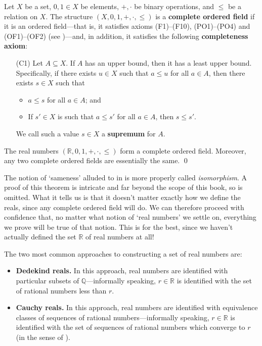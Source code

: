 \begin{axioms}
\label{axCompleteOrderedField}
Let $X$ be a set, $0,1 \in X$ be elements, $+,{\cdot}$ be binary operations, and $\le$ be a relation on $X$. The structure $(X,0,1,+,{\cdot},{\le})$ is a \textbf{complete ordered field} if it is an ordered field---that is, it satisfies axioms (F1)--(F10), (PO1)--(PO4) and (OF1)--(OF2) (see )---and, in addition, it satisfies the following \textbf{completeness axiom}:
\begin{itemize}[leftmargin=30pt]
\item[(C1)] Let $A \subseteq X$. If $A$ has an upper bound, then it has a least upper bound. Specifically, if there exists $u \in X$ such that $a \le u$ for all $a \in A$, then there exists $s \in X$ such that
\begin{itemize}
\item $a \le s$ for all $a \in A$; and
\item If $s' \in X$ is such that $a \le s'$ for all $a \in A$, then $s \le s'$.
\end{itemize}
We call such a value $s \in X$ a \textbf{supremum} for $A$.
\end{itemize}
\end{axioms}

\begin{theorem}
\label{thmRIsTheUniqueCompleteOrderedField}
The real numbers $(\mathbb{R},0,1,+,\cdot,\le)$ form a complete ordered field. Moreover, any two complete ordered fields are essentially the same. \qed
\end{theorem}

The notion of `sameness' alluded to in  is more properly called \textit{isomorphism}. A proof of this theorem is intricate and far beyond the scope of this book, so is omitted. What it tells us is that it doesn't matter exactly how we define the reals, since any complete ordered field will do. We can therefore proceed with confidence that, no matter what notion of `real numbers' we settle on, everything we prove will be true of that notion. This is for the best, since we haven't actually defined the set $\mathbb{R}$ of real numbers at all!

The two most common approaches to constructing a set of real numbers are:
\begin{itemize}
\item \textbf{Dedekind reals.} In this approach, real numbers are identified with particular subsets of $\mathbb{Q}$---informally speaking, $r \in \mathbb{R}$ is identified with the set of rational numbers less than $r$.
\item \textbf{Cauchy reals.} In this approach, real numbers are identified with equivalence classes of sequences of rational numbers---informally speaking, $r \in \mathbb{R}$ is identified with the set of sequences of rational numbers which converge to $r$ (in the sense of ).
\end{itemize}

\todo{}